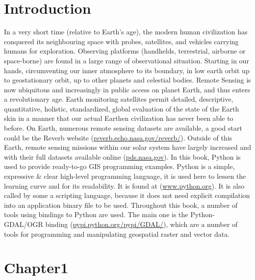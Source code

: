 \documentclass[10pt]{book}
\begin{document}
\chapter{Introduction}
In a very short time (relative to Earth's age), the modern human civilization has conquered its neighbouring space with
probes, satellites, and vehicles carrying humans for exploration. Observing platforms (handhelds, 
terrestrial, airborne or space-borne) are found in a large range of observational situation. 
Starting in our hands, circumventing our inner atmosphere to its boundary, in low earth orbit up to geostationary orbit,
up to other planets and celestial bodies.\newline\linebreak
Remote Sensing is now ubiquitous and increasingly in public access on planet Earth, and thus enters a revolutionary age.
Earth monitoring satellites permit detailed, descriptive, quantitative, holistic, standardized, global evaluation
of the state of the Earth skin in a manner that our actual Earthen civilization has never been able to before.\newline\linebreak
On Earth, numerous remote sensing datasets are available, a good start could be the Reverb website (\href{http://reverb.echo.nasa.gov/reverb/}{reverb.echo.nasa.gov/reverb/}). Outside of this Earth, remote sensing missions within our solar system have largely increased and with their full datasets available online (\href{http://pds.nasa.gov}{pds.nasa.gov}).\newline\linebreak
In this book, Python is used to provide ready-to-go GIS programming examples. Python is a simple, expressive \& clear high-level programming language, it is used here to lessen the learning curve and for its readability. It is found at
(\href{http://www.python.org}{www.python.org}). It is also called by some a scripting language,
because it does not need explicit compilation into an application binary file to be used. Throughout this book, a number of
tools using bindings to Python are used. The main one is the Python-GDAL/OGR binding 
(\href{http://pypi.python.org/pypi/GDAL/}{pypi.python.org/pypi/GDAL/}), which are a number of tools for programming
and manipulating geospatial raster and vector data.\newline
\newpage
\chapter{Chapter1}
\end{document}
